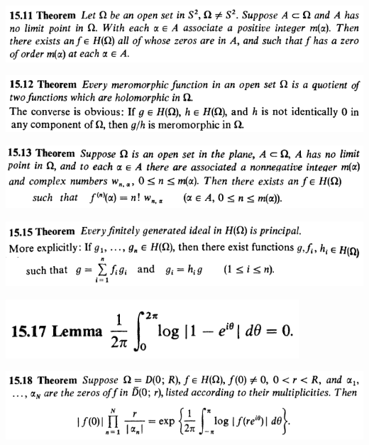 \documentclass[12pt]{article}
\begin{document}
		\begin{center}
		\includegraphics{15ponto11}
		\end{center}

		\begin{center}
		\includegraphics{15ponto12}
		\end{center}

		\begin{center}
		\includegraphics{15ponto13}
		\end{center}

		\begin{center}
		\includegraphics{15ponto15}
		\end{center}

		\begin{center}
		\includegraphics{15ponto17}
		\end{center}

		\begin{center}
		\includegraphics{15ponto18}
		\end{center}
\end{document}
